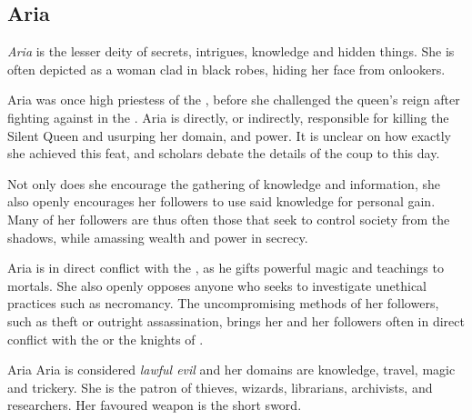 \subsection{Aria}
\label{sec:Aria}

\emph{Aria} is the lesser deity of secrets, intrigues, knowledge and hidden
things. She is often depicted as a woman clad in black robes, hiding her face
from onlookers.

Aria was once high priestess of the , before she
challenged the queen's reign after fighting against 
in the . Aria is directly, or indirectly,
responsible for killing the Silent Queen and usurping her domain, and
power. It is unclear on how exactly she achieved this feat, and scholars
debate the details of the coup to this day.

Not only does she encourage the gathering of knowledge and information, she
also openly encourages her followers to use said knowledge for personal gain.
Many of her followers are thus often those that seek to control society from
the shadows, while amassing wealth and power in secrecy.

Aria is in direct conflict with the , as he gifts
powerful magic and teachings to mortals. She also openly opposes anyone who
seeks to investigate unethical practices such as necromancy. The
uncompromising methods of her followers, such as theft or outright
assassination, brings her and her followers often in direct conflict with the
 or the knights of .

\begin{35e}{Aria}
  Aria is considered \emph{lawful evil} and her domains are knowledge, travel,
  magic and trickery. She is the patron of thieves, wizards, librarians,
  archivists, and researchers. Her favoured weapon is the short sword.
\end{35e}
